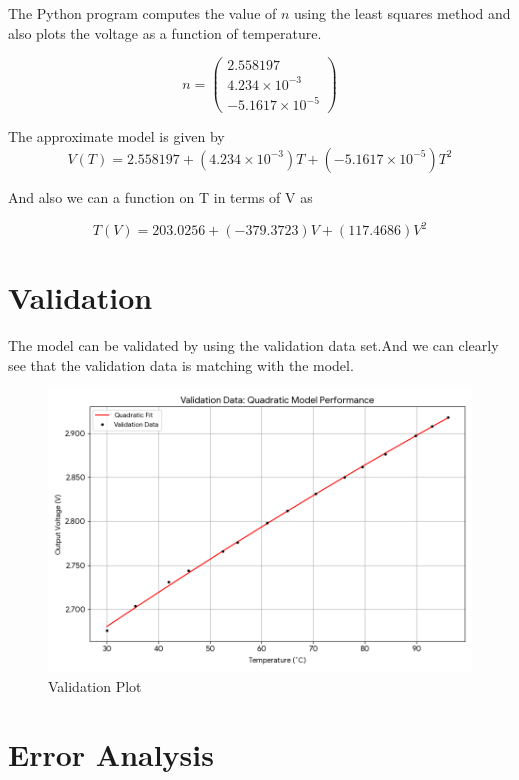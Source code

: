 \documentclass{article}
\begin{document}
The Python program  computes the value of $n$ using the least squares method and also plots the voltage as a function of temperature.

\[
n =
\begin{pmatrix}
2.558197 \\
4.234 \times 10^{-3} \\
-5.1617 \times 10^{-5}
\end{pmatrix}
\]

The approximate model is given by
\[
V(T) = 2.558197 + (4.234 \times 10^{-3})T + (-5.1617 \times 10^{-5})T^2
\]

\vspace{1 cm}
And also we can a function on T in terms of V as

\[
T(V) = 203.0256+ (-379.3723)V + (117.4686)V^2
\]


\section*{Validation}

The model can be validated by using the validation data set.And we can clearly see that the validation data is matching with the model.

\begin{figure}[H]
    \centering
    \includegraphics[width=1\textwidth]{figs/validation.png}
    \caption{Validation Plot}
    \label{fig:circuit}
\end{figure}

\section*{Error Analysis}
\end{document}
